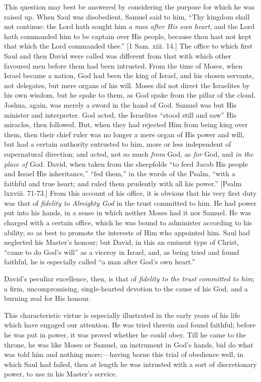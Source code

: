 This question may best be answered by considering the purpose for
which he was raised up. When Saul was disobedient, Samuel said to him,
``Thy kingdom shall not continue: the Lord hath sought him \emph{a} \emph{man
after His own heart}, and the Lord hath commanded him to be captain
over His people, because thou hast not kept that which the Lord
commanded thee.'' [1 Sam. xiii. 14.] The office to which first
Saul and then David were called was different from that with which
other favoured men before them had been intrusted. From the time of
Moses, when Israel became a nation, God had been the king of Israel,
and his chosen servants, not delegates, but mere organs of his will.
Moses did not direct the Israelites by his own wisdom, but he spake to
them, as God spake from the pillar of the cloud. Joshua, again, was
merely a sword in the hand of God. Samuel was but His minister and
interpreter. God acted, the Israelites ``stood still and saw''
His miracles, then followed. But, when they had rejected Him from
being king over them, then their chief ruler was no longer a mere
organ of His power and will, but had a certain authority entrusted to
him, more or less independent of supernatural direction; and acted,
not so much \emph{from} God, as \emph{for} God, and \emph{in the place of}
God. David, when taken from the sheepfolds ``to feed Jacob His
people and Israel His inheritance,'' ``fed them,'' in the
words of the Psalm, ``with a faithful and true heart; and ruled
them prudently with all his power.'' [Psalm lxxviii. 71-73.] From
this account of his office, it is obvious that his very first duty was
that of \emph{fidelity to Almighty God} in the trust committed to him.
He had power put into his hands, in a sense in which neither Moses had
it nor Samuel. He was charged with a certain office, which he was
bound to administer according to his ability, so as best to promote
the interests of Him who appointed him. Saul had neglected his Master's
honour; but David, in this an eminent type of Christ, ``came to do
God's will'' as a viceroy in Israel, and, as being tried and found
faithful, he is especially called ``a man after God's own
heart.''

David's peculiar excellence, then, is that of \emph{fidelity to the
trust committed to him}; a firm, uncompromising, single-hearted
devotion to the cause of his God, and a burning zeal for His honour.

This characteristic virtue is especially illustrated in the early
years of his life which have engaged our attention. He was tried
therein and found faithful; before he was put in power, it was proved
whether he could obey. Till he came to the throne, he was like Moses
or Samuel, an instrument in God's hands, bid do what was told him and
nothing more;—having borne this trial of obedience well, in which
Saul had failed, then at length he was intrusted with a sort of
discretionary power, to use in his Master's service.

